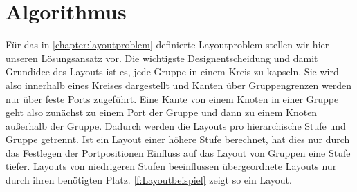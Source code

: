 \chapter{Algorithmus} %
\label{chapter:algo}


Für das in \autoref{chapter:layoutproblem} definierte Layoutproblem stellen wir hier unseren Lösungsansatz vor.
Die wichtigste Designentscheidung und damit Grundidee des Layouts ist es, jede Gruppe in einem Kreis zu kapseln. Sie wird also innerhalb eines Kreises dargestellt und Kanten über Gruppengrenzen werden nur über feste Ports zugeführt. Eine Kante von einem Knoten in einer Gruppe geht also zunächst zu einem Port der Gruppe und dann zu einem Knoten außerhalb der Gruppe.
Dadurch werden die Layouts pro hierarchische Stufe und Gruppe getrennt. 
Ist ein Layout einer höhere Stufe berechnet, hat dies nur durch das Festlegen der Portpositionen Einfluss auf das Layout von Gruppen eine Stufe tiefer.  Layouts von niedrigeren Stufen beeinflussen übergeordnete Layouts nur durch ihren benötigten Platz.
\autoref{f:Layoutbeispiel} zeigt so ein Layout.


